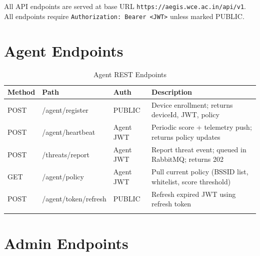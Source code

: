 \documentclass[12pt,a4paper]{report}
\begin{document}
All API endpoints are served at base URL \texttt{https://aegis.wce.ac.in/api/v1}. All endpoints require \texttt{Authorization: Bearer <JWT>} unless marked PUBLIC.

\section{Agent Endpoints}

\begin{longtable}{@{}p{1.5cm}p{5cm}p{2cm}p{5cm}@{}}
  \toprule
  \textbf{Method} & \textbf{Path} & \textbf{Auth} & \textbf{Description} \\
  \midrule
  \endhead
  POST & /agent/register    & PUBLIC     & Device enrollment; returns deviceId, JWT, policy \\
  POST & /agent/heartbeat   & Agent JWT  & Periodic score + telemetry push; returns policy updates \\
  POST & /threats/report    & Agent JWT  & Report threat event; queued in RabbitMQ; returns 202 \\
  GET  & /agent/policy      & Agent JWT  & Pull current policy (BSSID list, whitelist, score threshold) \\
  POST & /agent/token/refresh & PUBLIC   & Refresh expired JWT using refresh token \\
  \bottomrule
  \caption{Agent REST Endpoints}
\end{longtable}

\section{Admin Endpoints}
\end{document}
